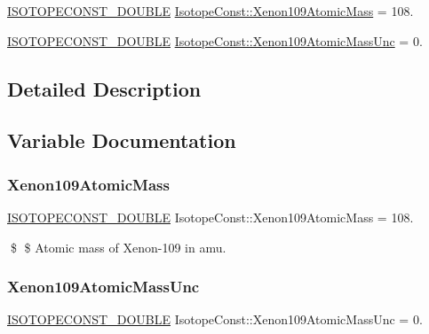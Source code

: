 \begin{DoxyCompactItemize}
\item 
\mbox{\hyperlink{group___isotope_const-_macros_ga8f45a7272ce02c0b4c65c44636ed719a}{I\+S\+O\+T\+O\+P\+E\+C\+O\+N\+S\+T\+\_\+\+D\+O\+U\+B\+LE}} \mbox{\hyperlink{group___isotope_const-_xenon-_xe109_ga3ef86d2bda5a4b82c0dbec6b5635470a}{Isotope\+Const\+::\+Xenon109\+Atomic\+Mass}} = 108.
\item 
\mbox{\hyperlink{group___isotope_const-_macros_ga8f45a7272ce02c0b4c65c44636ed719a}{I\+S\+O\+T\+O\+P\+E\+C\+O\+N\+S\+T\+\_\+\+D\+O\+U\+B\+LE}} \mbox{\hyperlink{group___isotope_const-_xenon-_xe109_ga1fcfdd4fd5da170d1ec17f1f848ca455}{Isotope\+Const\+::\+Xenon109\+Atomic\+Mass\+Unc}} = 0.
\end{DoxyCompactItemize}


\subsection{Detailed Description}


\subsection{Variable Documentation}
\mbox{\label{group___isotope_const-_xenon-_xe109_ga3ef86d2bda5a4b82c0dbec6b5635470a}} 
\subsubsection{\texorpdfstring{Xenon109\+Atomic\+Mass}{Xenon109AtomicMass}}
{\footnotesize\ttfamily \mbox{\hyperlink{group___isotope_const-_macros_ga8f45a7272ce02c0b4c65c44636ed719a}{I\+S\+O\+T\+O\+P\+E\+C\+O\+N\+S\+T\+\_\+\+D\+O\+U\+B\+LE}} Isotope\+Const\+::\+Xenon109\+Atomic\+Mass = 108.}

\$ \$ Atomic mass of Xenon-\/109 in amu. \mbox{\label{group___isotope_const-_xenon-_xe109_ga1fcfdd4fd5da170d1ec17f1f848ca455}} 
\subsubsection{\texorpdfstring{Xenon109\+Atomic\+Mass\+Unc}{Xenon109AtomicMassUnc}}
{\footnotesize\ttfamily \mbox{\hyperlink{group___isotope_const-_macros_ga8f45a7272ce02c0b4c65c44636ed719a}{I\+S\+O\+T\+O\+P\+E\+C\+O\+N\+S\+T\+\_\+\+D\+O\+U\+B\+LE}} Isotope\+Const\+::\+Xenon109\+Atomic\+Mass\+Unc = 0.}

